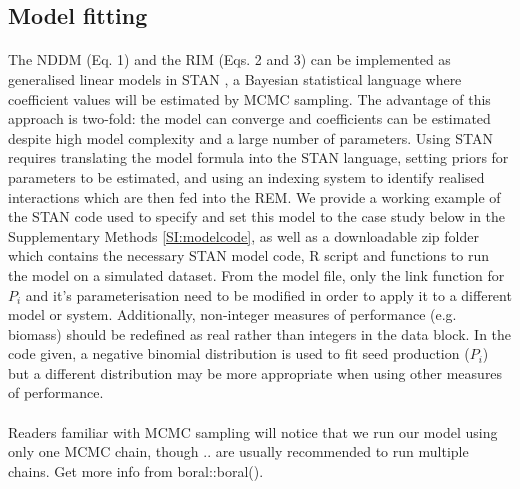 \documentclass[a4,12pt]{article}
\begin{document}
    \subsection{Model fitting}

        \paragraph{}        
        The NDDM (Eq. 1) and the RIM (Eqs. 2 and 3) can be implemented as generalised linear models in STAN \parencite{Carpenter2017}, a Bayesian statistical language where coefficient values will be estimated by MCMC sampling. The advantage of this approach is two-fold: the model can converge and coefficients can be estimated despite high model complexity and a large number of parameters. Using STAN requires translating the model formula into the STAN language, setting priors for parameters to be estimated, and using an indexing system to identify realised interactions which are then fed into the REM. We provide a working example of the STAN code used to specify and set this model to the case study below in the Supplementary Methods \ref{SI:modelcode}, as well as a downloadable zip folder which contains the necessary STAN model code, R script and functions to run the model on a simulated dataset. From the model file, only the link function for $P_i$ and it's parameterisation need to be modified in order to apply it to a different model or system. Additionally, non-integer measures of performance (e.g. biomass) should be redefined as real rather than integers in the data block. In the code given, a negative binomial distribution is used to fit seed production ($P_i$) but a different distribution may be more appropriate when using other measures of performance.   

        \paragraph{}
        Readers familiar with MCMC sampling will notice that we run our model using only one MCMC chain, though .. are usually recommended to run multiple chains. Get more info from boral::boral(). 
\end{document}
